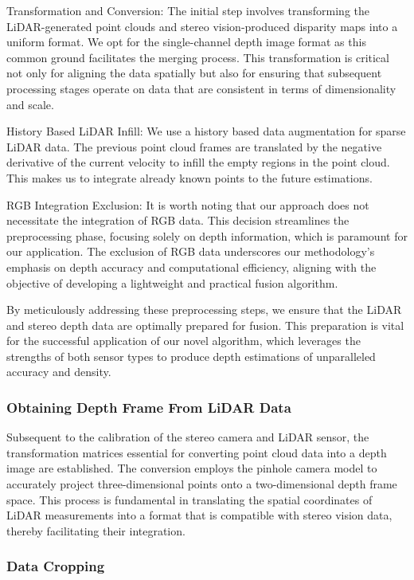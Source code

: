 \documentclass[conference]{IEEEtran}
\begin{document}
Transformation and Conversion: The initial step involves transforming the LiDAR-generated point clouds and stereo vision-produced disparity maps into a uniform format. We opt for the single-channel depth image format as this common ground facilitates the merging process. This transformation is critical not only for aligning the data spatially but also for ensuring that subsequent processing stages operate on data that are consistent in terms of dimensionality and scale.

History Based LiDAR Infill: We use a history based data augmentation for sparse LiDAR data. The previous point cloud frames are translated by the negative derivative of the current velocity to infill the empty regions in the point cloud. This makes us to integrate already known points to the future estimations.

RGB Integration Exclusion: It is worth noting that our approach does not necessitate the integration of RGB data. This decision streamlines the preprocessing phase, focusing solely on depth information, which is paramount for our application. The exclusion of RGB data underscores our methodology's emphasis on depth accuracy and computational efficiency, aligning with the objective of developing a lightweight and practical fusion algorithm.

By meticulously addressing these preprocessing steps, we ensure that the LiDAR and stereo depth data are optimally prepared for fusion. This preparation is vital for the successful application of our novel algorithm, which leverages the strengths of both sensor types to produce depth estimations of unparalleled accuracy and density.

\subsubsection{Obtaining Depth Frame From LiDAR Data}

Subsequent to the calibration of the stereo camera and LiDAR sensor, the transformation matrices essential for converting point cloud data into a depth image are established. The conversion employs the pinhole camera model to accurately project three-dimensional points onto a two-dimensional depth frame space. This process is fundamental in translating the spatial coordinates of LiDAR measurements into a format that is compatible with stereo vision data, thereby facilitating their integration.

\subsubsection{Data Cropping}
\end{document}
